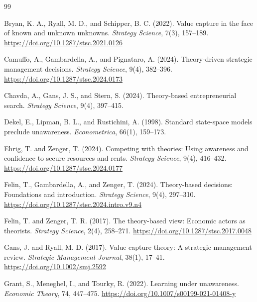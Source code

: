 \documentclass[11pt]{article}
\begin{document}
	\begin{thebibliography}{99}
		
		Bryan, K. A., Ryall, M. D., and Schipper, B. C. (2022).
		Value capture in the face of known and unknown unknowns.
		\emph{Strategy Science}, 7(3), 157--189.
		\url{https://doi.org/10.1287/stsc.2021.0126}
		
		Camuffo, A., Gambardella, A., and Pignataro, A. (2024).
		Theory-driven strategic management decisions.
		\emph{Strategy Science}, 9(4), 382--396.
		\url{https://doi.org/10.1287/stsc.2024.0173}
		
		Chavda, A., Gans, J. S., and Stern, S. (2024).
		Theory-based entrepreneurial search.
		\emph{Strategy Science}, 9(4), 397--415.
		
		Dekel, E., Lipman, B. L., and Rustichini, A. (1998).
		Standard state-space models preclude unawareness.
		\emph{Econometrica}, 66(1), 159--173.
		
		Ehrig, T. and Zenger, T. (2024).
		Competing with theories: Using awareness and confidence to secure resources and rents.
		\emph{Strategy Science}, 9(4), 416--432.
		\url{https://doi.org/10.1287/stsc.2024.0177}
		
		Felin, T., Gambardella, A., and Zenger, T. (2024).
		Theory-based decisions: Foundations and introduction.
		\emph{Strategy Science}, 9(4), 297--310.
		\url{https://doi.org/10.1287/stsc.2024.intro.v9.n4}
		
		Felin, T. and Zenger, T. R. (2017).
		The theory-based view: Economic actors as theorists.
		\emph{Strategy Science}, 2(4), 258--271.
		\url{https://doi.org/10.1287/stsc.2017.0048}
		
		Gans, J. and Ryall, M. D. (2017).
		Value capture theory: A strategic management review.
		\emph{Strategic Management Journal}, 38(1), 17--41.
		\url{https://doi.org/10.1002/smj.2592}
		
		Grant, S., Meneghel, I., and Tourky, R. (2022).
		Learning under unawareness.
		\emph{Economic Theory}, 74, 447--475.
		\url{https://doi.org/10.1007/s00199-021-01408-y}
		

\end{thebibliography}
\end{document}
